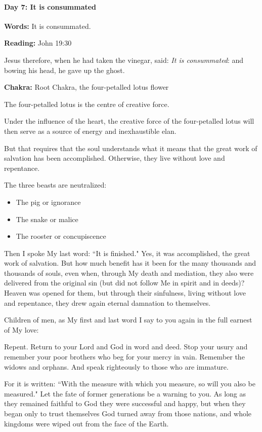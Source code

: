 \paragraph{Day 7: It is consummated}

\textbf{Words:} It is consummated.

\textbf{Reading:} John 19:30


\begin{quotex}
Jesus therefore, when he had taken the vinegar, said: \textit{It is consummated}: and bowing his head, he gave up the ghost. 

\end{quotex}
\textbf{Chakra:} Root Chakra, the four-petalled lotus flower

The four-petalled lotus is the centre of creative force.

Under the influence of the heart, the creative force of the four-petalled lotus will then serve as a source of energy and inexhaustible elan.

But that requires that the soul understands what it means that the great work of salvation has been  accomplished. Otherwise, they live without love and repentance.

The three beasts are neutralized:

\begin{itemize}
\item The pig or ignorance 
\item The snake or malice 
\item The rooster or concupiscence 
\end{itemize}

\begin{quotex}
Then I spoke My last word: ``It is finished." Yes, it was accomplished, the great work of salvation. But how much benefit has it been for the many thousands and thousands of souls, even when, through My death and mediation, they also were delivered from the original sin (but did not follow Me in spirit and in deeds)? Heaven was opened for them, but through their sinfulness, living without love and repentance, they drew again eternal damnation to themselves.

Children of men, as My first and last word I say to you again in the full earnest of My love:

Repent. Return to your Lord and God in word and deed. Stop your usury and remember your poor brothers who beg for your mercy in vain. Remember the widows and orphans. And speak righteously to those who are immature.

For it is written: ``With the measure with which you measure, so will you also be measured." Let the fate of former generations be a warning to you. As long as they remained faithful to God they were successful and happy, but when they began only to trust themselves God turned away from those nations, and whole kingdoms were wiped out from the face of the Earth. 
\end{quotex}

